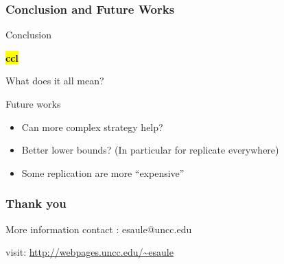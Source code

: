 \documentclass[usenames,dvipsnames]{beamer}
\newcommand{\todo}[1]{{\color{red}\textbf{\hl{#1}}\xspace}}
\begin{document}
\begin{frame}
  \frametitle{Conclusion and Future Works}

  \begin{block}{Conclusion}

    \todo{ccl}
    
    What does it all mean?
  \end{block}

  \begin{block}{Future works}
    \begin{itemize}
    \item Can more complex strategy help?
    \item Better lower bounds? (In particular for replicate everywhere)
    \item Some replication are more ``expensive''
    \end{itemize}
  \end{block}
\end{frame}



\begin{frame}
  \frametitle{Thank you}

    \begin{block}{More information}
    contact : esaule@uncc.edu
    
    visit: \url{http://webpages.uncc.edu/~esaule}
  \end{block}

\end{frame}
\end{document}
